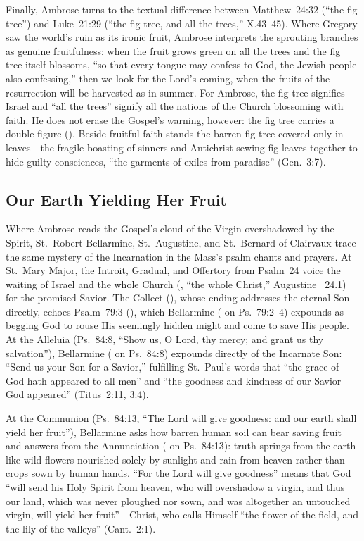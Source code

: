 Finally, Ambrose turns to the textual difference between Matthew~24:32 (``the fig tree'') and Luke~21:29 (``the fig tree, and all the trees,'' X.43--45). Where Gregory saw the world's ruin as its ironic fruit, Ambrose interprets the sprouting branches as genuine fruitfulness: when the fruit grows green on all the trees and the fig tree itself blossoms, ``so that every tongue may confess to God, the Jewish people also confessing,'' then we look for the Lord's coming, when the fruits of the resurrection will be harvested as in summer. For Ambrose, the fig tree signifies Israel and ``all the trees'' signify all the nations of the Church blossoming with faith. He does not erase the Gospel's warning, however: the fig tree carries a double figure (). Beside fruitful faith stands the barren fig tree covered only in leaves---the fragile boasting of sinners and Antichrist sewing fig leaves together to hide guilty consciences, ``the garments of exiles from paradise'' (Gen.~3:7).

\subsection{Our Earth Yielding Her Fruit}

Where Ambrose reads the Gospel's cloud of the Virgin overshadowed by the Spirit, St.~Robert Bellarmine, St.~Augustine, and St.~Bernard of Clairvaux trace the same mystery of the Incarnation in the Mass's psalm chants and prayers. At St.~Mary Major, the Introit, Gradual, and Offertory from Psalm~24 voice the waiting of Israel and the whole Church (, ``the whole Christ,'' Augustine ~24.1) for the promised Savior. The Collect (), whose  ending addresses the eternal Son directly, echoes Psalm~79:3 (), which Bellarmine ( on Ps.~79:2--4) expounds as begging God to rouse His seemingly hidden might and come to save His people. At the Alleluia (Ps.~84:8, ``Show us, O Lord, thy mercy; and grant us thy salvation''), Bellarmine ( on Ps.~84:8) expounds  directly of the Incarnate Son: ``Send us your Son for a Savior,'' fulfilling St.~Paul's words that ``the grace of God hath appeared to all men'' and ``the goodness and kindness of our Savior God appeared'' (Titus~2:11, 3:4).

At the Communion (Ps.~84:13, ``The Lord will give goodness: and our earth shall yield her fruit''), Bellarmine asks how barren human soil can bear saving fruit and answers from the Annunciation ( on Ps.~84:13): truth springs from the earth like wild flowers nourished solely by sunlight and rain from heaven rather than crops sown by human hands. ``For the Lord will give goodness'' means that God ``will send his Holy Spirit from heaven, who will overshadow a virgin, and thus our land, which was never ploughed nor sown, and was altogether an untouched virgin, will yield her fruit''---Christ, who calls Himself ``the flower of the field, and the lily of the valleys'' (Cant.~2:1).

